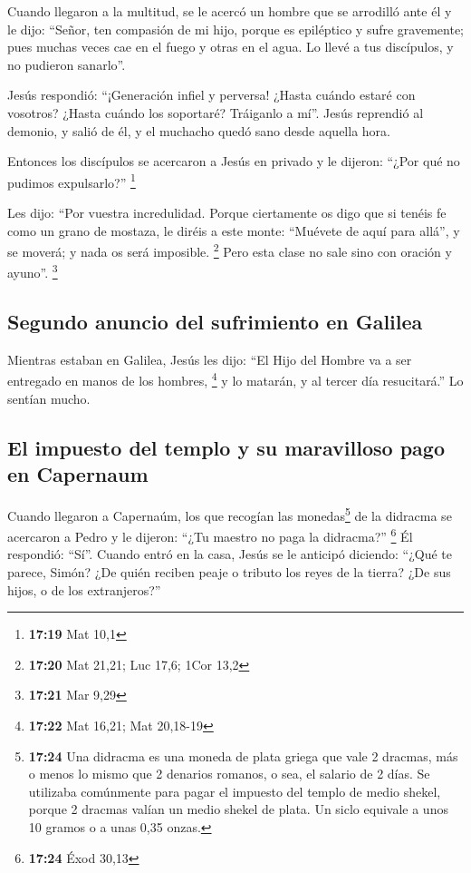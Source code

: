  Cuando llegaron a la multitud, se le acercó un hombre
que se arrodilló ante él y le dijo:  ``Señor, ten
compasión de mi hijo, porque es epiléptico y sufre gravemente; pues
muchas veces cae en el fuego y otras en el agua.  Lo
llevé a tus discípulos, y no pudieron sanarlo''.

 Jesús respondió: ``¡Generación infiel y perversa! ¿Hasta
cuándo estaré con vosotros? ¿Hasta cuándo los soportaré? Tráiganlo a
mí''.  Jesús reprendió al demonio, y salió de él, y el
muchacho quedó sano desde aquella hora.

 Entonces los discípulos se acercaron a Jesús en privado
y le dijeron: ``¿Por qué no pudimos expulsarlo?'' \footnote{\textbf{17:19}
  Mat 10,1}

 Les dijo: ``Por vuestra incredulidad. Porque ciertamente
os digo que si tenéis fe como un grano de mostaza, le diréis a este
monte: ``Muévete de aquí para allá'', y se moverá; y nada os será
imposible. \footnote{\textbf{17:20} Mat 21,21; Luc 17,6; 1Cor 13,2}
 Pero esta clase no sale sino con oración y ayuno''.
\footnote{\textbf{17:21} Mar 9,29}

\hypertarget{segundo-anuncio-del-sufrimiento-en-galilea}{%
\subsection{Segundo anuncio del sufrimiento en
Galilea}\label{segundo-anuncio-del-sufrimiento-en-galilea}}

 Mientras estaban en Galilea, Jesús les dijo: ``El Hijo
del Hombre va a ser entregado en manos de los hombres, \footnote{\textbf{17:22}
  Mat 16,21; Mat 20,18-19}  y lo matarán, y al tercer día
resucitará.'' Lo sentían mucho.

\hypertarget{el-impuesto-del-templo-y-su-maravilloso-pago-en-capernaum}{%
\subsection{El impuesto del templo y su maravilloso pago en
Capernaum}\label{el-impuesto-del-templo-y-su-maravilloso-pago-en-capernaum}}

 Cuando llegaron a Capernaúm, los que recogían las
monedas\footnote{\textbf{17:24} Una didracma es una moneda de plata
  griega que vale 2 dracmas, más o menos lo mismo que 2 denarios
  romanos, o sea, el salario de 2 días. Se utilizaba comúnmente para
  pagar el impuesto del templo de medio shekel, porque 2 dracmas valían
  un medio shekel de plata. Un siclo equivale a unos 10 gramos o a unas
  0,35 onzas.} de la didracma se acercaron a Pedro y le dijeron: ``¿Tu
maestro no paga la didracma?'' \footnote{\textbf{17:24} Éxod 30,13}
 Él respondió: ``Sí''. Cuando entró en la casa, Jesús se
le anticipó diciendo: ``¿Qué te parece, Simón? ¿De quién reciben peaje o
tributo los reyes de la tierra? ¿De sus hijos, o de los extranjeros?''

